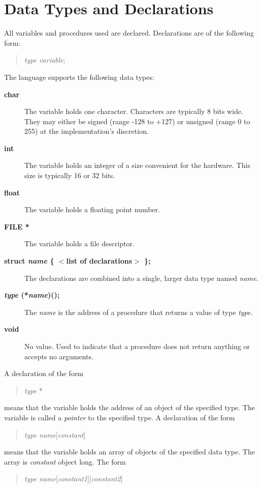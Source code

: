 \section{Data Types and Declarations}
\par
All variables and procedures used are declared. Declarations are of %
the following form: %
\begin{quote}
{\it type variable}; %
\end{quote}
\par
The language supports the following data types: %
\begin{description} %
\item[{\bf char}] The variable holds one character. Characters are %
typically 8 bits wide. They may either be signed (range -128 to +127) %
or unsigned (range 0 to 255) at the implementation's discretion. %
\item[{\bf int}] The variable holds an integer of a size convenient %
for the hardware. This size is typically 16 or 32 bits. %
\item[{\bf float}] The variable holds a floating point number. %
\item[{\bf FILE *}] The variable holds a file descriptor. %
\item[{\bf struct {\it name} \{ $<$list of declarations$>$ \};}] The %
declarations are combined into a single, larger data type named {\it name}. %
\item[{\bf {\it type} (*{\it name})();}] The {\it name} is the address %
of a procedure that returns a value of type {\it type}. %
\item[{\bf void}] No value. Used to indicate that a procedure does %
not return anything or accepts no arguments. %
\end{description}
\par
A declaration of the form %
\begin{quote}
 {\it type} * %
\end{quote}
\par
means that the variable holds the address of an object of the specified %
type. The variable is called a {\it pointer} to the specified type. %
 A declaration of the form %
\begin{quote}
 {\it type name}[{\it constant}] %
\end{quote}
\par
means that the variable holds an array of objects of the specified %
data type. The array is {\it constant} object long. The form %
\begin{quote}
 {\it type name}[{\it constant1}][{\it constant2}] %
\end{quote}
